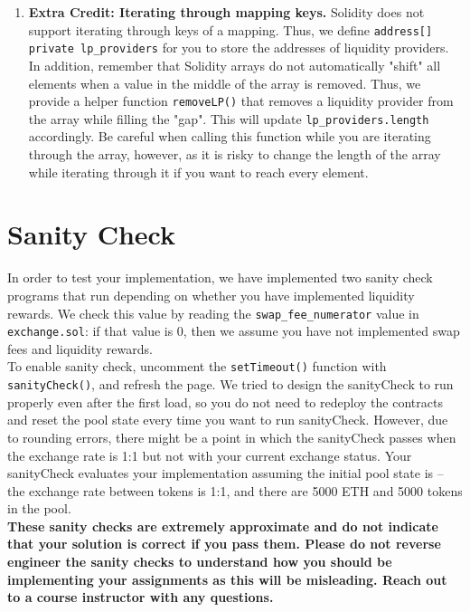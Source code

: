 \documentclass[11pt]{article}
\begin{document}
\begin{enumerate}
    \item \textbf{Extra Credit: Iterating through mapping keys.} Solidity does not support iterating through keys of a mapping. Thus, we define \texttt{address[] private lp\_providers} for you to store the addresses of liquidity providers. In addition, remember that Solidity arrays do not automatically "shift" all elements when a value in the middle of the array is removed. Thus, we provide a helper function \texttt{removeLP()} that removes a liquidity provider from the array while filling the "gap". This will update \texttt{lp\_providers.length} accordingly. Be careful when calling this function while you are iterating through the array, however, as it is risky to change the length of the array while iterating through it if you want to reach every element. 
\end{enumerate}

\section{Sanity Check}
In order to test your implementation, we have implemented two sanity check programs that run depending on whether you have implemented liquidity rewards. We check this value by reading the \texttt{swap\_fee\_numerator} value in \texttt{exchange.sol}: if that value is 0, then we assume you have not implemented swap fees and liquidity rewards. \\

To enable sanity check, uncomment the \texttt{setTimeout()} function with \texttt{sanityCheck()}, and refresh the page. We tried to design the sanityCheck to run properly even after the first load, so you do not need to redeploy the contracts and reset the pool state every time you want to run sanityCheck. However, due to rounding errors, there might be a point in which the sanityCheck passes when the exchange rate is 1:1 but not with your current exchange status. Your sanityCheck evaluates your implementation  assuming the initial pool state is -- the exchange rate between tokens is 1:1, and there are 5000 ETH and 5000 tokens in the pool.\\

\textbf{These sanity checks are extremely approximate and do not indicate that your solution is correct if you pass them. Please do not reverse engineer the sanity checks to understand how you should be implementing your assignments as this will be misleading. Reach out to a course instructor with any questions.}
\end{document}
